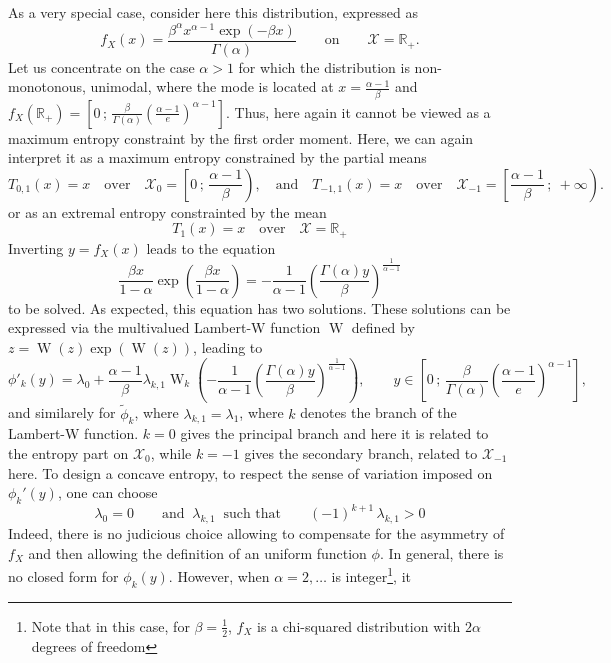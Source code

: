 \documentclass[english,onecolumn]{elsarticle}
\def\Rset{\mathbb{R}}
\def\X{\mathcal{X}}
\def\W{\operatorname{W}}
\begin{document}
As a very special case, consider here this distribution, expressed as
%
\[
f_X(x) = \frac{\beta^\alpha x^{\alpha-1} \exp(-\beta x)}{\Gamma(\alpha)} \qquad
\mbox{on} \qquad \X = \Rset_+.
\]
%
Let  us concentrate  on the  case $\alpha  > 1$  for which  the  distribution is
non-monotonous,   unimodal,    where   the   mode    is   located   at    $x   =
\frac{\alpha-1}{\beta}$    and   $f_X(\Rset_+)    =   \left[    0   \,    ;   \,
  \frac{\beta}{\Gamma(\alpha)}   \left(  \frac{\alpha-1}{e}  \right)^{\alpha-1}
\right]$.  Thus, here again it cannot  be viewed as a maximum entropy constraint
by the first order moment. Here, we  can again interpret it as a maximum entropy
constrained by the partial means
%
\[
T_{0,1}(x) = x \quad \mbox{over} \quad \X_0 = \left[ 0 \, ; \,
\frac{\alpha-1}{\beta} \right), \quad \mbox{and} \quad T_{-1,1}(x) = x \quad
\mbox{over} \quad \X_{-1} = \left[\frac{\alpha-1}{\beta} \, ; \: + \infty
\right).
\]
%
or as an extremal entropy constrainted by the mean
%
\[
T_1(x) = x \quad \mbox{over} \quad \X = \Rset_+
\]
%
%
Inverting $y = f_X(x)$ leads to the equation
%
\[
\frac{\beta x}{1-\alpha} \exp\left(\frac{\beta x}{1-\alpha}\right) = -
\frac{1}{\alpha-1} \left( \frac{\Gamma(\alpha) y}{\beta}
\right)^{\frac{1}{\alpha-1}}
\]
%
to be solved. As expected, this  equation has two solutions. These solutions can
be expressed via  the multivalued Lambert-W function $\W$ defined  by $z = \W(z)
\exp(\W(z))$, leading to
%
\[
\phi'_k(y) = \lambda_0 + \frac{\alpha-1}{\beta} \lambda_{k,1} \W_k \left( -
\frac{1}{\alpha-1} \left( \frac{\Gamma(\alpha) y}{\beta}
\right)^{\frac{1}{\alpha-1}} \right), \qquad y \in \left[ 0 \, ; \,
\frac{\beta}{\Gamma(\alpha)} \left( \frac{\alpha-1}{e}\right)^{\alpha-1} \right],
\]
%
and  similarely  for $\widetilde{\phi}_k$,  where  $\lambda_{k,1} =  \lambda_1$,
where  $k$ denotes the  branch of  the Lambert-W  function.  $k  = 0$  gives the
principal branch and here it is related  to the entropy part on $\X_0$, while $k
= -1$ gives the secondary branch, related to $\X_{-1}$ here. To design a concave
entropy,  to respect the  sense of  variation imposed  on $\phi_k'(y)$,  one can
choose
%
\[
\lambda_0 = 0 \qquad \mbox{and } \: \lambda_{k,1} \: \mbox{ such that} \qquad
(-1)^{k+1} \, \lambda_{k,1} > 0
\]
%
Indeed, there is  no judicious choice allowing to  compensate for the asymmetry
of $f_X$  and then  allowing the  definition of an  uniform function  $\phi$. In
general,  there is  no  closed form  for  $\phi_k(y)$. However,  when $\alpha  =
2,\ldots$ is  integer\footnote{Note that  in this case,  for $\beta  = \frac12$,
  $f_X$ is  a chi-squared distribution with  $2 \alpha$ degrees  of freedom}, it
\end{document}
